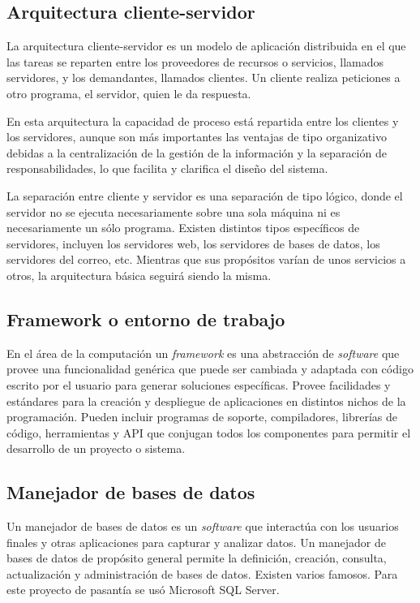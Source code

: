 \subsection{Arquitectura cliente-servidor}

La arquitectura cliente-servidor es un modelo de aplicación distribuida en el que las tareas se reparten entre los proveedores de recursos o servicios, llamados servidores, y los demandantes, llamados clientes. Un cliente realiza peticiones a otro programa, el servidor, quien le da respuesta.

En esta arquitectura la capacidad de proceso está repartida entre los clientes y los servidores, aunque son más importantes las ventajas de tipo organizativo debidas a la centralización de la gestión de la información y la separación de responsabilidades, lo que facilita y clarifica el diseño del sistema.

La separación entre cliente y servidor es una separación de tipo lógico, donde el servidor no se ejecuta necesariamente sobre una sola máquina ni es necesariamente un sólo programa. Existen distintos tipos específicos de servidores, incluyen los servidores web, los servidores de bases de datos, los servidores del correo, etc. Mientras que sus propósitos varían de unos servicios a otros, la arquitectura básica seguirá siendo la misma\cite{bib:clienteServidor}.

\subsection{Framework o entorno de trabajo} 

En el área de la computación un \emph{framework} es una abstracción de \emph{software} que provee una funcionalidad genérica que puede ser cambiada y adaptada con código escrito por el usuario para generar soluciones específicas. Provee facilidades y estándares para la creación y despliegue de aplicaciones en distintos nichos de la programación. Pueden incluir programas de soporte, compiladores, librerías de código, herramientas y \gls{API} que conjugan todos los componentes para permitir el desarrollo de un proyecto o sistema\cite{bib:framework}.

\subsection{Manejador de bases de datos} 

Un manejador de bases de datos es un \emph{software} que interactúa con los usuarios finales y otras aplicaciones para capturar y analizar datos. Un manejador de bases de datos de propósito general permite la definición, creación, consulta, actualización y administración de bases de datos. Existen varios famosos. Para este proyecto de pasantía se usó Microsoft \gls{SQL} Server\cite{bib:dbms}.

